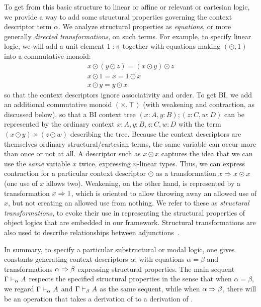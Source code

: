 To get from this basic structure to linear or affine or relevant or
cartesian logic, we provide a way to add some structural properties governing
the context descriptor term $\alpha$.  We analyze structural properties
as \emph{equations}, or more generally \emph{directed transformations},
on such terms.  For example, to specify linear logic, we will add a unit
element $1 : \mathsf{n}$ together with equations making $(\odot,1)$ into a
commutative monoid:
\[
\begin{array}{c}
x \odot (y \odot z) = (x \odot y) \odot z\\
x \odot 1 = x = 1 \odot x\\
x \odot y = y \odot x
\end{array}
\]
so that the context descriptors ignore associativity and order.  To get
BI, we add an additional commutative monoid $(\times,\top)$ (with
weakening and contraction, as discussed below), so that a BI context
tree $(x:A,y:B);(z:C,w:D)$ can be represented by the ordinary context
$x:A,y:B,z:C,w:D$ with the term $(x \odot y) \times (z \odot w)$
describing the tree.  Because the context descriptors are themselves
ordinary structural/cartesian terms, the same variable can occur more
than once or not at all.  A descriptor such as $x \odot x$ captures the
idea that we can use the \emph{same} variable $x$ twice, expressing
$n$-linear types.  Thus, we can express contraction for a particular
context descriptor $\odot$ as a transformation $x \Rightarrow x \odot x$ (one
use of $x$ allows two).  Weakening, on the other hand, is represented by
a transformation $x \Rightarrow 1$, which is oriented to allow throwing away an
allowed use of $x$, but not creating an allowed use from nothing.  We
refer to these as \emph{structural transformations}, to evoke their use
in representing the structural properties of object logics that are
embedded in our framework.  Structural transformations are also used to
describe relationships between adjunctions~\citep{ls16adjoint}.  

In summary, to specify a particular substructural or modal logic, one
gives constants generating context descriptors $\alpha$, with equations
$\alpha = \beta$ and transformations $\alpha \Rightarrow \beta$ expressing
structural properties.  The main sequent $\Gamma \vdash_{\alpha} A$
respects the specified structural properties in the sense that when
$\alpha = \beta$, we regard $\Gamma \vdash_{\alpha} A$ and
$\Gamma \vdash_{\beta} A$ as the same sequent, while when $\alpha \Rightarrow
\beta$, there will be an operation that takes a derivation of
 to a derivation of .

